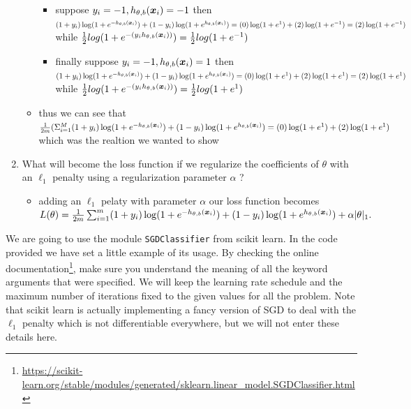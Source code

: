 \documentclass{article}
\begin{document}
\begin{enumerate}
\begin{itemize}
\begin{itemize}
                \item suppose $y_i=-1,h_{\theta, b}(\boldsymbol{x}_i)=-1$ then $(1 + y_i) \log ( 1 + e^{- h_{\theta, b}(\boldsymbol{x}_i)}) +  (1 - y_i) \log(1 + e^{h_{\theta, b}(\boldsymbol{x}_i)})=(0) \log ( 1 + e^{1}) +  (2) \log(1 + e^{-1})=(2) \log ( 1 + e^{-1})$ while   $\frac{1}{2}log(1+e^{-(y_i h_{\theta, b}(\boldsymbol{x}_i))})=\frac{1}{2}log(1+e^{-1})$
    \item finally suppose $y_i=-1,h_{\theta, b}(\boldsymbol{x}_i)=1$ then $(1 + y_i) \log ( 1 + e^{- h_{\theta, b}(\boldsymbol{x}_i)}) +  (1 - y_i) \log(1 + e^{h_{\theta, b}(\boldsymbol{x}_i)})=(0) \log ( 1 + e^{1}) +  (2) \log(1 + e^{1})=(2) \log ( 1 + e^{1})$ while   $\frac{1}{2}log(1+e^{-(y_i h_{\theta, b}(\boldsymbol{x}_i))})=\frac{1}{2}log(1+e^{1})$
    \end{itemize}
\item thus we can see that $\frac{1}{2m}(\Sigma_{i=1}^{M}(1 + y_i) \log ( 1 + e^{- h_{\theta, b}(\boldsymbol{x}_i)}) +  (1 - y_i) \log(1 + e^{h_{\theta, b}(\boldsymbol{x}_i)})=(0) \log ( 1 + e^{1}) +  (2) \log(1 + e^{1})$ which was the realtion we wanted to show
\end{itemize}


  \item What will become the loss function if we regularize the coefficients of $\theta$ with an $\ell_1$ penalty using a regularization parameter $\alpha$ ?

  \begin{itemize}
      \item adding an $\ell_{1}$ pelaty with parameter $\alpha$ our loss function becomes     $L(\theta) = \frac 1 {2 m} \sum_{i=1}^m  (1 + y_i) \log ( 1 + e^{- h_{\theta, b}(\boldsymbol{x}_i)}) +  (1 - y_i) \log(1 + e^{h_{\theta, b}(\boldsymbol{x}_i)})+\alpha|\theta|_{1}.$
  \end{itemize}
  

\setcounter{saveenum}{\value{enumi}}
\end{enumerate}

We are going to use the module \texttt{SGDClassifier} from scikit learn. In the code provided we have set a little example of its usage. By checking the online documentation\footnote{\url{https://scikit-learn.org/stable/modules/generated/sklearn.linear_model.SGDClassifier.html}}, make sure you understand the meaning of all the keyword arguments that were specified. We will keep the learning rate schedule and the maximum number of iterations fixed to the given values for all the problem. Note that scikit learn is actually implementing a fancy version of SGD to deal with the $\ell_1$ penalty which is not differentiable everywhere, but we will not enter these details here.
\end{document}
